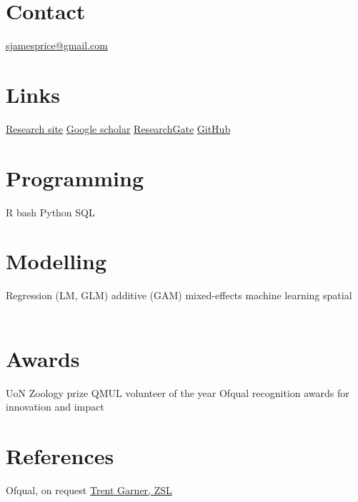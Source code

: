 \documentclass[]{friggeri-cv-a4}
\begin{document}



\begin{aside} %
\section{Contact}
\href{mailto:sjamesprice@gmail.com}{\small{sjamesprice@gmail.com}}
~
\section{Links}
\href{https://2infectious.wordpress.com}{Research site}
\href{https://scholar.google.co.uk/citations?user=Ob0mGTUAAAAJ&hl=en&oi=sra}{Google scholar}
\href{https://www.researchgate.net/profile/Stephen_Price10}{ResearchGate}
\href{https://github.com/lizardburns}{GitHub}
~
~
~
\section{Programming}
R
bash
Python
SQL
~
\section{Modelling}
Regression (LM, GLM)
additive (GAM)
mixed-effects
machine learning
spatial
~
~
~
\section{Awards}
UoN Zoology prize
QMUL volunteer of the year
Ofqual recognition awards for innovation and impact
~
~
~
\section{References}
Ofqual, on request
\href{mailto:Trent.Garner@ioz.ac.uk}{Trent Garner, ZSL}
~
\end{aside}

\end{document}
